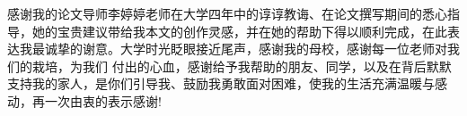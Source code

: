 感谢我的论文导师李婷婷老师在大学四年中的谆谆教诲、在论文撰写期间的悉心指导，她的宝贵建议带给我本文的创作灵感，并在她的帮助下得以顺利完成，在此表达我最诚挚的谢意。大学时光眨眼接近尾声，感谢我的母校，感谢每一位老师对我们的栽培，为我们 付出的心血，感谢给予我帮助的朋友、同学，以及在背后默默支持我的家人，是你们引导我、鼓励我勇敢面对困难，使我的生活充满温暖与感动，再一次由衷的表示感谢!
